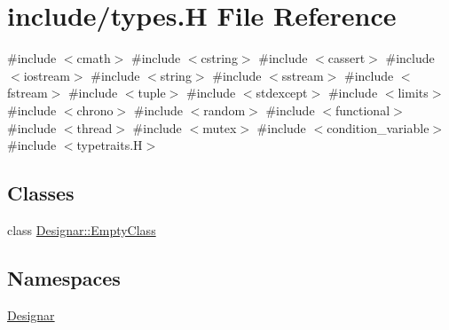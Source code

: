 \hypertarget{types_8_h}{}\section{include/types.H File Reference}
\label{types_8_h}
{\ttfamily \#include $<$cmath$>$}\newline
{\ttfamily \#include $<$cstring$>$}\newline
{\ttfamily \#include $<$cassert$>$}\newline
{\ttfamily \#include $<$iostream$>$}\newline
{\ttfamily \#include $<$string$>$}\newline
{\ttfamily \#include $<$sstream$>$}\newline
{\ttfamily \#include $<$fstream$>$}\newline
{\ttfamily \#include $<$tuple$>$}\newline
{\ttfamily \#include $<$stdexcept$>$}\newline
{\ttfamily \#include $<$limits$>$}\newline
{\ttfamily \#include $<$chrono$>$}\newline
{\ttfamily \#include $<$random$>$}\newline
{\ttfamily \#include $<$functional$>$}\newline
{\ttfamily \#include $<$thread$>$}\newline
{\ttfamily \#include $<$mutex$>$}\newline
{\ttfamily \#include $<$condition\+\_\+variable$>$}\newline
{\ttfamily \#include $<$typetraits.\+H$>$}\newline
\subsection*{Classes}
\begin{DoxyCompactItemize}
\item 
class \hyperlink{class_designar_1_1_empty_class}{Designar\+::\+Empty\+Class}
\end{DoxyCompactItemize}
\subsection*{Namespaces}
\begin{DoxyCompactItemize}
\item 
 \hyperlink{namespace_designar}{Designar}
\end{DoxyCompactItemize}
